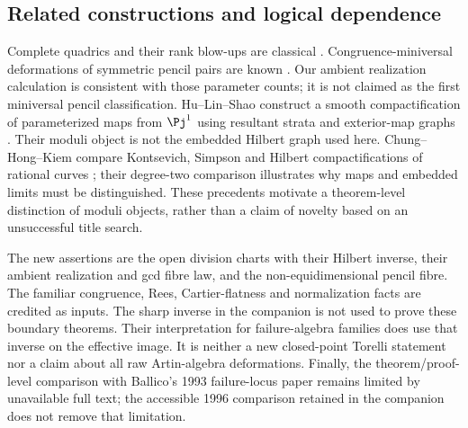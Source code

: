 \subsection{Related constructions and logical dependence}
Complete quadrics and their rank blow-ups are classical
\cite[Remark~2.5 and Construction~2.6]{Massarenti2020}.
Congruence-miniversal deformations of symmetric pencil pairs are
known \cite[Theorem~2.1]{Dmytryshyn162}. Our ambient realization
calculation is consistent with those parameter counts; it is not
claimed as the first miniversal pencil classification.
Hu--Lin--Shao construct a smooth compactification of parameterized
maps from $\Pj^1$ using resultant strata and exterior-map graphs
\cite[Theorem~1.1]{HuLinShao162}. Their moduli object is not the
embedded Hilbert graph used here. Chung--Hong--Kiem compare
Kontsevich, Simpson and Hilbert compactifications of rational curves
\cite{ChungHongKiem162}; their degree-two comparison illustrates why
maps and embedded limits must be distinguished. These precedents
motivate a theorem-level distinction of moduli objects, rather than
a claim of novelty based on an unsuccessful title search.

The new assertions are the open division charts with their Hilbert
inverse, their ambient realization and gcd fibre law, and the
non-equidimensional pencil fibre. The familiar congruence, Rees,
Cartier-flatness and normalization facts are credited as inputs.
The sharp inverse in the companion is not used to prove these
boundary theorems. Their interpretation for failure-algebra families
does use that inverse on the effective image. It is neither a new
closed-point Torelli statement nor a claim about all raw Artin-algebra
deformations. Finally, the theorem/proof-level comparison with
Ballico's 1993 failure-locus paper \cite{Ballico93} remains limited
by unavailable full text; the accessible 1996 comparison retained
in the companion does not remove that limitation.

